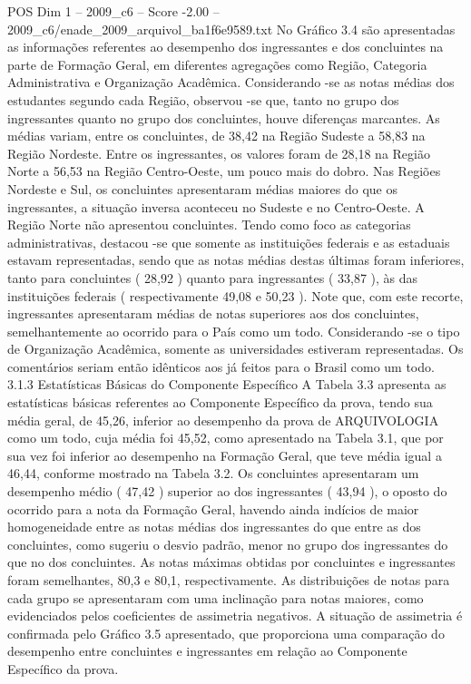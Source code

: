 \begin{textsample}{POS Dim 1 – 2009\_c6 – Score -2.00 – 2009\_c6/enade\_2009\_arquivol\_ba1f6e9589.txt}
No Gráfico 3.4 são apresentadas as informações referentes ao desempenho dos ingressantes e dos concluintes na parte de Formação Geral, em diferentes agregações como Região, Categoria Administrativa e Organização Acadêmica.
Considerando -se as notas médias dos estudantes segundo cada Região, observou -se que, tanto no grupo dos ingressantes quanto no grupo dos concluintes, houve diferenças marcantes.
As médias variam, entre os concluintes, de 38,42 na Região Sudeste a 58,83 na Região Nordeste.
Entre os ingressantes, os valores foram de 28,18 na Região Norte a 56,53 na Região Centro-Oeste, um pouco mais do dobro.
Nas Regiões Nordeste e Sul, os concluintes apresentaram médias maiores do que os ingressantes, a situação inversa aconteceu no Sudeste e no Centro-Oeste.
A Região Norte não apresentou concluintes.
Tendo como foco as categorias administrativas, destacou -se que somente as instituições federais e as estaduais estavam representadas, sendo que as notas médias destas últimas foram inferiores, tanto para concluintes ( 28,92 ) quanto para ingressantes ( 33,87 ), às das instituições federais ( respectivamente 49,08 e 50,23 ).
Note que, com este recorte, ingressantes apresentaram médias de notas superiores aos dos concluintes, semelhantemente ao ocorrido para o País como um todo.
Considerando -se o tipo de Organização Acadêmica, somente as universidades estiveram representadas.
Os comentários seriam então idênticos aos já feitos para o Brasil como um todo. 3.1.3 Estatísticas Básicas do Componente Específico A Tabela 3.3 apresenta as estatísticas básicas referentes ao Componente Específico da prova, tendo sua média geral, de 45,26, inferior ao desempenho da prova de ARQUIVOLOGIA como um todo, cuja média foi 45,52, como apresentado na Tabela 3.1, que por sua vez foi inferior ao desempenho na Formação Geral, que teve média igual a 46,44, conforme mostrado na Tabela 3.2.
Os concluintes apresentaram um desempenho médio ( 47,42 ) superior ao dos ingressantes ( 43,94 ), o oposto do ocorrido para a nota da Formação Geral, havendo ainda indícios de maior homogeneidade entre as notas médias dos ingressantes do que entre as dos concluintes, como sugeriu o desvio padrão, menor no grupo dos ingressantes do que no dos concluintes.
As notas máximas obtidas por concluintes e ingressantes foram semelhantes, 80,3 e 80,1, respectivamente.
As distribuições de notas para cada grupo se apresentaram com uma inclinação para notas maiores, como evidenciados pelos coeficientes de assimetria negativos.
A situação de assimetria é confirmada pelo Gráfico 3.5 apresentado, que proporciona uma comparação do desempenho entre concluintes e ingressantes em relação ao Componente Específico da prova.

\end{textsample}
